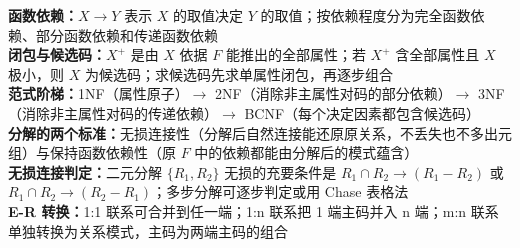 \documentclass[a4paper,11pt]{article}
\begin{document}

\begin{knowmap}
\textbf{函数依赖：}$X\to Y$ 表示 $X$ 的取值决定 $Y$ 的取值；按依赖程度分为完全函数依赖、部分函数依赖和传递函数依赖\\[2pt]
\textbf{闭包与候选码：}$X^{+}$ 是由 $X$ 依据 $F$ 能推出的全部属性；若 $X^{+}$ 含全部属性且 $X$ 极小，则 $X$ 为候选码；求候选码先求单属性闭包，再逐步组合\\[2pt]
\textbf{范式阶梯：}1NF（属性原子）$\rightarrow$ 2NF（消除非主属性对码的部分依赖）$\rightarrow$ 3NF（消除非主属性对码的传递依赖）$\rightarrow$ BCNF（每个决定因素都包含候选码）\\[2pt]
\textbf{分解的两个标准：}无损连接性（分解后自然连接能还原原关系，不丢失也不多出元组）与保持函数依赖性（原 $F$ 中的依赖都能由分解后的模式蕴含）\\[2pt]
\textbf{无损连接判定：}二元分解 $\{R_1,R_2\}$ 无损的充要条件是 $R_1\cap R_2\to(R_1-R_2)$ 或 $R_1\cap R_2\to(R_2-R_1)$；多步分解可逐步判定或用 Chase 表格法\\[2pt]
\textbf{E-R 转换：}1:1 联系可合并到任一端；1:n 联系把 1 端主码并入 n 端；m:n 联系单独转换为关系模式，主码为两端主码的组合
\end{knowmap}
\end{document}
